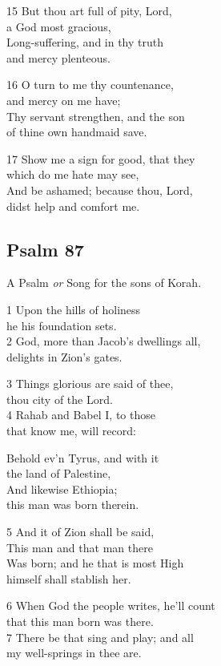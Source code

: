 15 But thou art full of pity, Lord,\\
a God most gracious,\\
Long-suffering, and in thy truth\\
and mercy plenteous.

16 O turn to me thy countenance,\\
and mercy on me have;\\
Thy servant strengthen, and the son\\
of thine own handmaid save.

17 Show me a sign for good, that they\\
which do me hate may see,\\
And be ashamed; because thou, Lord,\\
didst help and comfort me.

\begin{center}
\quad{}\quad{}
\end{center}

\subsection*{Psalm 87}

A Psalm \emph{or} Song for the sons of Korah.

1 Upon the hills of holiness\\
he his foundation sets.\\
2 God, more than Jacob’s dwellings all,\\
delights in Zion’s gates.

3 Things glorious are said of thee,\\
thou city of the Lord.\\
4 Rahab and Babel I, to those\\
that know me, will record:

Behold ev’n Tyrus, and with it\\
the land of Palestine,\\
And likewise Ethiopia;\\
this man was born therein.

5 And it of Zion shall be said,\\
This man and that man there\\
Was born; and he that is most High\\
himself shall stablish her.

6 When God the people writes, he’ll count\\
that this man born was there.\\
7 There be that sing and play; and all\\
my well-springs in thee are.

